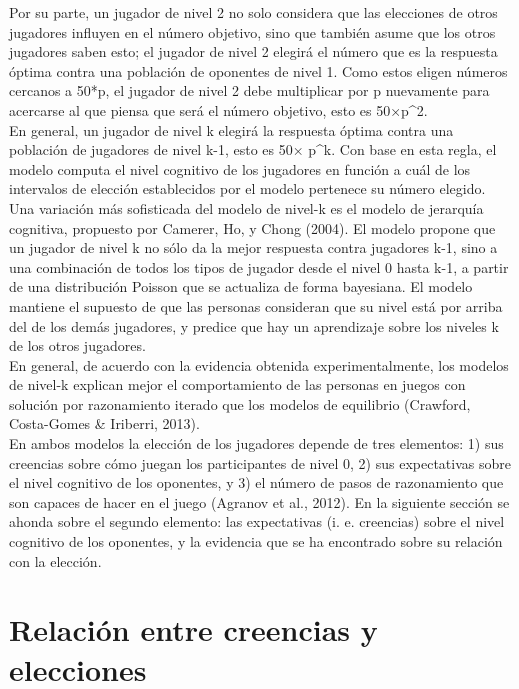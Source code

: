Por su parte, un jugador de nivel 2 no solo considera que las elecciones de otros jugadores influyen en el número objetivo, sino que también asume que los otros jugadores saben esto; el jugador de nivel 2 elegirá el número que es la respuesta óptima contra una población de oponentes de nivel 1. Como estos eligen números cercanos a 50*p, el jugador de nivel 2 debe multiplicar por p nuevamente para acercarse al que piensa que será el número objetivo, esto es 50×p^2.\\

En general, un jugador de nivel k elegirá la respuesta óptima contra una población de jugadores de nivel k-1, esto es 50× p^k.  Con base en esta regla, el modelo  computa el nivel cognitivo de los jugadores en función a cuál de los intervalos de elección establecidos por el modelo pertenece su número elegido. 
Una variación más sofisticada del modelo de nivel-k es el modelo de jerarquía cognitiva, propuesto por Camerer, Ho, y Chong (2004). El modelo propone que un jugador de nivel k no sólo da la mejor respuesta contra jugadores k-1, sino a una combinación de todos los tipos de jugador desde el nivel 0 hasta k-1, a partir de una distribución Poisson que se actualiza de forma bayesiana. El modelo mantiene el supuesto de que las personas consideran que su nivel está por arriba del de los demás jugadores, y predice que hay un aprendizaje sobre los niveles k de los otros jugadores.\\

En general, de acuerdo con la evidencia obtenida experimentalmente, los modelos de nivel-k explican mejor el comportamiento de las personas en juegos con solución por razonamiento iterado que los modelos de equilibrio (Crawford, Costa-Gomes & Iriberri, 2013).\\

En ambos modelos la elección de los jugadores depende de tres elementos: 1) sus creencias sobre cómo juegan los participantes de nivel 0, 2) sus expectativas sobre el nivel cognitivo de los oponentes, y 3) el número de pasos de razonamiento que son capaces de hacer en el juego (Agranov et al., 2012).
En la siguiente sección se ahonda sobre el segundo elemento: las expectativas (i. e. creencias) sobre el nivel cognitivo de los oponentes, y la evidencia que se ha encontrado sobre su relación con la elección.\\

\section{Relación entre creencias y elecciones}

